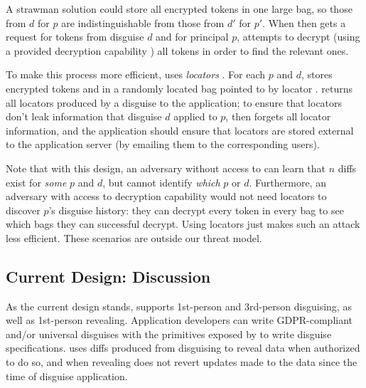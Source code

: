 A strawman solution could store all encrypted tokens in one large bag, so those from
$d$ for $p$ are indistinguishable from those from $d'$ for $p'$. When \sys then gets a request for
tokens from disguise $d$ and for principal $p$, \sys attempts to decrypt (using a provided
decryption capability ) all tokens in order to find the relevant ones.

To make this process more efficient, \sys uses \emph{locators }. For each $p$ and $d$,
\sys stores encrypted tokens  and  in a randomly located bag pointed to by
locator . \sys returns all locators produced by a disguise to the application; to ensure
that locators don't leak information that disguise $d$ applied to $p$, \sys then forgets all locator
information, and the application should ensure that locators are stored external to the application
server (\eg by emailing them to the corresponding users).

Note that with this design, an adversary without access to  can learn that $n$ diffs exist
for \emph{some} $p$ and $d$, but cannot identify \emph{which} $p$ or $d$. 
%
Furthermore, an adversary with access to decryption capability  would not need locators to
discover $p$'s disguise history: they can decrypt every token in every bag to see which bags they
can successful decrypt. Using locators just makes such an attack less efficient.
%
These scenarios are outside our threat model.



\iffalse
\subsection{Current Design: Discussion}
As the current design stands, \sys supports 1st-person and 3rd-person disguising, as well as
1st-person revealing.
%
Application developers can write GDPR-compliant and/or universal disguises with the primitives
exposed by \sys to write disguise specifications.
%
\sys uses diffs produced from disguising to reveal data when authorized to do so, and when
revealing does not revert updates made to the data since the time of disguise application.

